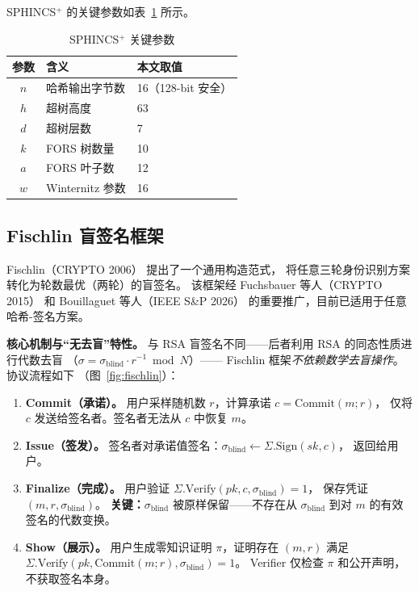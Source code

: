 \documentclass[11pt,a4paper]{ctexart}
\begin{document}
SPHINCS$^+$ 的关键参数如表~\ref{tab:params} 所示。

\begin{table}[h]
\centering
\caption{SPHINCS$^+$ 关键参数}
\label{tab:params}
\begin{tabular}{@{}cll@{}}
\toprule
\textbf{参数} & \textbf{含义} & \textbf{本文取值} \\
\midrule
$n$   & 哈希输出字节数 & 16（128-bit 安全） \\
$h$   & 超树高度 & 63 \\
$d$   & 超树层数 & 7 \\
$k$   & FORS 树数量 & 10 \\
$a$   & FORS 叶子数 & 12 \\
$w$   & Winternitz 参数 & 16 \\
\bottomrule
\end{tabular}
\end{table}

\subsection{Fischlin 盲签名框架}

Fischlin（CRYPTO 2006）\cite{Fischlin2006} 提出了一个通用构造范式，
将任意三轮身份识别方案转化为轮数最优（两轮）的盲签名。
该框架经 Fuchsbauer 等人（CRYPTO 2015）\cite{Fuchsbauer2015Practical}
和 Bouillaguet 等人（IEEE S\&P 2026）\cite{Bouillaguet2026BlindingPH}
的重要推广，目前已适用于任意哈希-签名方案。

\textbf{核心机制与``无去盲''特性。}
与 RSA 盲签名不同——后者利用 RSA 的同态性质进行代数去盲
（$\sigma = \sigma_{\mathrm{blind}} \cdot r^{-1} \bmod N$）——
Fischlin 框架\emph{不依赖数学去盲操作}。协议流程如下
（图~\ref{fig:fischlin}）：

\begin{enumerate}[label=\textbf{阶段 \arabic*.},leftmargin=*]
\item \textbf{Commit（承诺）。}
用户采样随机数 $r$，计算承诺 $c = \mathrm{Commit}(m; r)$，
仅将 $c$ 发送给签名者。签名者无法从 $c$ 中恢复 $m$。
\item \textbf{Issue（签发）。}
签名者对承诺值签名：$\sigma_{\mathrm{blind}} \leftarrow \Sigma.\mathrm{Sign}(sk, c)$，
返回给用户。
\item \textbf{Finalize（完成）。}
用户验证 $\Sigma.\mathrm{Verify}(pk, c, \sigma_{\mathrm{blind}}) = 1$，
保存凭证 $(m, r, \sigma_{\mathrm{blind}})$。
\textbf{关键：}$\sigma_{\mathrm{blind}}$ 被原样保留——不存在从
$\sigma_{\mathrm{blind}}$ 到对 $m$ 的有效签名的代数变换。
\item \textbf{Show（展示）。}
用户生成零知识证明 $\pi$，证明存在 $(m, r)$ 满足
$\Sigma.\mathrm{Verify}(pk, \mathrm{Commit}(m; r), \sigma_{\mathrm{blind}}) = 1$。
Verifier 仅检查 $\pi$ 和公开声明，不获取签名本身。
\end{enumerate}
\end{document}
